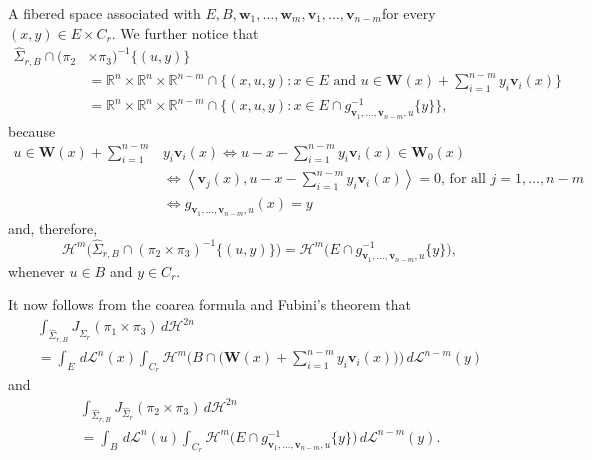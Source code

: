 \documentclass[JEP,XML,SOM,Unicode,ThmDefs,NoEqCountersInSection]{cedram}
\newenvironment{Empty}[2][\null]{%
\begin{enonce}[remark]{#1}#2}
{\end{enonce}}
\newcommand{\R}{\mathbb{R}}
\newcommand{\Rn}{\R^n}
\newcommand{\calH}{\mathscr{H}}
\newcommand{\calL}{\mathscr{L}}
\newcommand{\bW}{{\boldsymbol{W}}}
\newcommand{\bv}{{\boldsymbol{v}}}
\newcommand{\bw}{{\boldsymbol{w}}}
\let\la\langle
\let\ra\rangle
\begin{document}
\begin{Empty}[A fibered space associated with $E, B, \bw_1,\ldots,\bw_m,\bv_1,\ldots,\bv_{n-m}$]
for every $(x,y) \in E \times C_r$.
We further notice that
\begin{equation*}
\begin{split}
\hat{\Sigma}_{r,B} \cap (\pi_2 & \times \pi_3)^{-1} \{ (u,y) \} \\
& \textstyle = \Rn \times \Rn \times \R^{n-m} \cap \bigl\{ (x,u,y): x \in E \text{ and } u \in \bW(x) + \sum_{i=1}^{n-m} y_i\bv_i(x)\bigr\}\\
&= \Rn \times \Rn \times \R^{n-m} \cap \bigl\{ (x,u,y): x \in E \cap g_{\bv_1,\ldots,\bv_{n-m},u}^{-1}\{y\} \bigr\},
\end{split}
\end{equation*}
because
\begin{equation*}
\begin{split}
u \in \bW(x) + \sum_{i=1}^{n-m} &y_i \bv_i(x)  \iff u-x- \sum_{i=1}^{n-m} y_i \bv_i(x) \in \bW_0(x) \\
& \iff \textstyle\left\la \bv_j(x), u-x- \sum_{i=1}^{n-m} y_i \bv_i(x) \right\ra = 0 \text{, for all } j=1,\ldots,n-m \\
& \iff g_{\bv_1,\ldots,\bv_{n-m},u}(x) = y
\end{split}
\end{equation*}
and, therefore,
\begin{equation*}
\calH^m \bigl(\hat{\Sigma}_{r,B} \cap (\pi_2 \times \pi_3)^{-1} \{ (u,y) \} \bigr) = \calH^m \bigl(E \cap g_{\bv_1,\ldots,\bv_{n-m},u}^{-1}\{y\} \bigr),
\end{equation*}
whenever $u \in B$ and $y \in C_r$.
\par
It now follows from the coarea formula and Fubini's theorem that
\begin{multline}
\label{eq.20}
\int_{\hat{\Sigma}_{r,B}} J_{\hat{\Sigma}_r} (\pi_1 \times \pi_3) \,d\calH^{2n}\\[-5pt]
= \int_E \,d\calL^n(x)\int_{C_r} \calH^m \bigl(B \cap \bigl(\bW(x) + \textstyle\sum_{i=1}^{n-m} y_i \bv_i(x) \bigr) \bigr) \,d\calL^{n-m}(y)
\end{multline}
and
\begin{multline}
\label{eq.21}
\int_{\hat{\Sigma}_{r,B}} J_{\hat{\Sigma}_r} (\pi_2 \times \pi_3) \,d\calH^{2n}\\[-5pt]
= \int_B \,d\calL^n(u) \int_{C_r} \calH^m \bigl(E \cap g_{\bv_1,\ldots,\bv_{n-m},u}^{-1}\{y\} \bigr)\,d\calL^{n-m}(y).
\end{multline}
\end{Empty}
\end{document}
